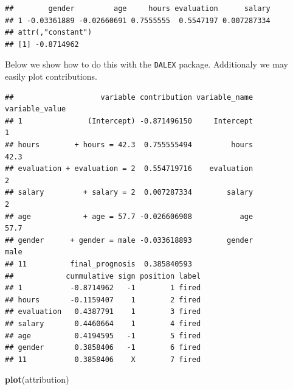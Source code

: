 \documentclass[]{krantz}
\newenvironment{Shaded}{\begin{snugshade}}{\end{snugshade}}
\newcommand{\DataTypeTok}[1]{\textcolor[rgb]{0.13,0.29,0.53}{#1}}
\newcommand{\KeywordTok}[1]{\textcolor[rgb]{0.13,0.29,0.53}{\textbf{#1}}}
\newcommand{\NormalTok}[1]{#1}
\newcommand{\OperatorTok}[1]{\textcolor[rgb]{0.81,0.36,0.00}{\textbf{#1}}}
\newcommand{\StringTok}[1]{\textcolor[rgb]{0.31,0.60,0.02}{#1}}
\theoremstyle{definition}
\theoremstyle{definition}
\theoremstyle{definition}
\theoremstyle{remark}
\begin{document}
\begin{verbatim}
##        gender         age     hours evaluation      salary
## 1 -0.03361889 -0.02660691 0.7555555  0.5547197 0.007287334
## attr(,"constant")
## [1] -0.8714962
\end{verbatim}

Below we show how to do this with the \texttt{DALEX} package.
Additionaly we may easily plot contributions.

\begin{Shaded}
\end{Shaded}

\begin{verbatim}
##                    variable contribution variable_name variable_value
## 1               (Intercept) -0.871496150     Intercept              1
## hours        + hours = 42.3  0.755555494         hours           42.3
## evaluation + evaluation = 2  0.554719716    evaluation              2
## salary         + salary = 2  0.007287334        salary              2
## age            + age = 57.7 -0.026606908           age           57.7
## gender      + gender = male -0.033618893        gender           male
## 11          final_prognosis  0.385840593                             
##            cummulative sign position label
## 1           -0.8714962   -1        1 fired
## hours       -0.1159407    1        2 fired
## evaluation   0.4387791    1        3 fired
## salary       0.4460664    1        4 fired
## age          0.4194595   -1        5 fired
## gender       0.3858406   -1        6 fired
## 11           0.3858406    X        7 fired
\end{verbatim}

\begin{Shaded}
\begin{Highlighting}[]
\KeywordTok{plot}\NormalTok{(attribution)}
\end{Highlighting}
\end{Shaded}
\end{document}
